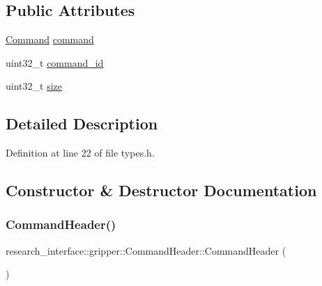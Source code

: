 \subsection*{Public Attributes}
\begin{DoxyCompactItemize}
\item 
\hyperlink{namespaceresearch__interface_1_1gripper_adeda0327764e059bac8a5f967ce41590}{Command} \hyperlink{structresearch__interface_1_1gripper_1_1CommandHeader_a5a5591a722d3dbef5999b3a4af4e6cc2}{command}
\item 
uint32\+\_\+t \hyperlink{structresearch__interface_1_1gripper_1_1CommandHeader_aa1260b5ed470826d10c918e849dc98b7}{command\+\_\+id}
\item 
uint32\+\_\+t \hyperlink{structresearch__interface_1_1gripper_1_1CommandHeader_a0f7845a3260620f694f65982da4b6610}{size}
\end{DoxyCompactItemize}


\subsection{Detailed Description}


Definition at line 22 of file types.\+h.



\subsection{Constructor \& Destructor Documentation}
\mbox{\label{structresearch__interface_1_1gripper_1_1CommandHeader_ae021f3ee2f4861ad42c2de81f32802cd}} 
\subsubsection{\texorpdfstring{Command\+Header()}{CommandHeader()}\hspace{0.1cm}{\footnotesize\ttfamily [1/2]}}
{\footnotesize\ttfamily research\+\_\+interface\+::gripper\+::\+Command\+Header\+::\+Command\+Header (\begin{DoxyParamCaption}{ }\end{DoxyParamCaption})\hspace{0.3cm}{\ttfamily [default]}}

